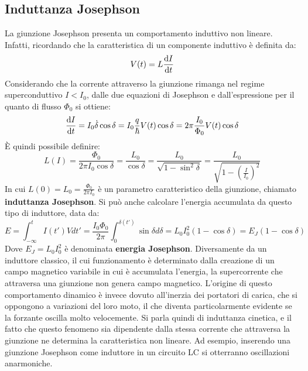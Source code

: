 \subsection{Induttanza Josephson}
La giunzione Josephson presenta un comportamento induttivo non lineare. Infatti, ricordando che la caratteristica di un componente induttivo è definita da:
\begin{equation*}
    V(t)=L\dv{I}{t}
\end{equation*}
Considerando che la corrente attraverso la giunzione rimanga nel regime superconduttivo $I<I_0$, dalle due equazioni di Josephson e dall'espressione per il quanto di flusso $\Phi_0$ si ottiene:
\begin{equation*}
    \dv{I}{t}=I_0\Dot\delta\cos\delta
            =I_0\frac{q}{\hbar}V(t)\cos\delta
            =2\pi\frac{I_0}{\Phi_0}V(t)\cos\delta 
\end{equation*}
È quindi possibile definire:
\begin{equation*}
    L(I)=\frac{\Phi_0}{2\pi I_0\cos\delta}
        =\frac{L_0}{\cos\delta}
        =\frac{L_0}{\sqrt{1-\sin^2\delta}}
        =\frac{L_0}{\sqrt{1-(\frac{I}{I_0})^2}}
\end{equation*}
In cui $L(0)=L_0=\frac{\Phi_0}{2\pi I_0}$ è un parametro caratteristico della giunzione, chiamato \textbf{induttanza Josephson}. Si può anche calcolare l'energia accumulata da questo tipo di induttore, data da:
\begin{equation*}
    E = \int_{-\infty}^t I(t')Vdt'
        = \frac{I_0\Phi_0}{2\pi}\int_{0}^{\delta(t')}\sin\delta d\delta
        = L_0I_0^2(1-\cos\delta)
        = E_J(1-\cos\delta)
\end{equation*}
Dove $E_J=L_0I_0^2$ è denominata \textbf{energia Josephson}. Diversamente da un induttore classico, il cui funzionamento è determinato dalla creazione di un campo magnetico variabile in cui è accumulata l'energia, la supercorrente che attraversa una giunzione non genera campo magnetico. L'origine di questo comportamento dinamico è invece dovuto all'inerzia dei portatori di carica, che si oppongono a variazioni del loro moto, il che diventa particolarmente evidente se la forzante oscilla molto velocemente. Si parla quindi di induttanza cinetica, e il fatto che questo fenomeno sia dipendente dalla stessa corrente che attraversa la giunzione ne determina la caratteristica non lineare. Ad esempio, inserendo una giunzione Josephson come induttore in un circuito LC si otterranno oscillazioni anarmoniche. 